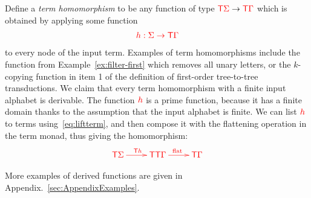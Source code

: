 

 
\noindent\begin{example}\label{ex:filter} 
   Define a \emph{term homomorphism}  to be any function of type ${\color{red}{\mathsf T}} {\color{red}{\Sigma}} \to {\color{red}{\mathsf T}} {\color{red}{\Gamma}}$ which is obtained by applying some function
   \begin{align*}
   {\color{red}{h : {\color{red}{\Sigma}}\to {\color{red}{\mathsf T}}{\color{red}{\Gamma}}}}
   \end{align*}
   to every node of the input term. Examples of term homomorphisms include the function from Example~\ref{ex:filter-first} which removes all unary letters, or the $k$-copying function in item 1 of the definition of first-order tree-to-tree transductions.  We claim that every term homomorphism with a finite input alphabet is derivable. The function ${\color{red}{h}}$ is a prime function, because it has a finite domain thanks to the assumption that the input alphabet is finite. We can list ${\color{red}{h}}$ to terms using~\eqref{eq:liftterm}, and then compose it with the flattening operation in the term monad, thus giving the homomorphism:
   \begin{align*}
   \ranked{\xymatrix{
\tmonad \rSigma \ar[r]^{\tmonad h} &
\tmonad \tmonad \rGamma \ar[r]^{\flatt} &
\tmonad \rGamma
   }}
   \end{align*} 
\end{example}

More examples of derived functions are given in Appendix.~\ref{sec:AppendixExamples}.